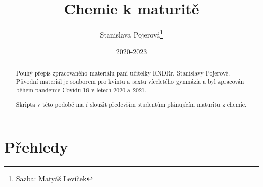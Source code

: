 \documentclass{article}
\title{Chemie k maturitě}
\author{Stanislava Pojerová\thanks{Sazba: Matyáš Levíček}}
\date{2020-2023}
\begin{document}
    \maketitle

    \begin{abstract}
        Pouhý přepis zpracovaného materiálu paní učitelky RNDRr. Stanislavy Pojerové. Původní materiál je souborem pro kvintu a sextu víceletého gymnázia a byl zpracován během pandemie Covidu 19 v letech 2020 a 2021.
        
        Skripta v této podobě mají sloužit především studentům plánujícím maturitu z chemie. 
    \end{abstract}

    \newpage
    \renewcommand{\contentsname}{Obsah podle tématu}
    \tableofcontents
    \newpage
    
    
    
    
    
\newlength\origheight
\setlength\origheight{\textheight}

\section{Přehledy}
    
\end{document}
